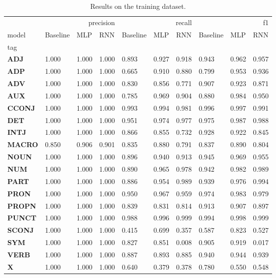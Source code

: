 \begin{table}
\caption{Results on the training dataset.}
\label{tab::ex_2_train}
\begin{tabular}{|l||l||l||l||l||l||l||l||l||l|}
\toprule
 & \multicolumn{3}{r}{precision} & \multicolumn{3}{r}{recall} & \multicolumn{3}{r}{f1} \\
model & Baseline & MLP & RNN & Baseline & MLP & RNN & Baseline & MLP & RNN \\
tag &  &  &  &  &  &  &  &  &  \\
\midrule
\textbf{ADJ} & 1.000 & 1.000 & 1.000 & 0.893 & 0.927 & 0.918 & 0.943 & 0.962 & 0.957 \\
\textbf{ADP} & 1.000 & 1.000 & 1.000 & 0.665 & 0.910 & 0.880 & 0.799 & 0.953 & 0.936 \\
\textbf{ADV} & 1.000 & 1.000 & 1.000 & 0.830 & 0.856 & 0.771 & 0.907 & 0.923 & 0.871 \\
\textbf{AUX} & 1.000 & 1.000 & 1.000 & 0.785 & 0.969 & 0.904 & 0.880 & 0.984 & 0.950 \\
\textbf{CCONJ} & 1.000 & 1.000 & 1.000 & 0.993 & 0.994 & 0.981 & 0.996 & 0.997 & 0.991 \\
\textbf{DET} & 1.000 & 1.000 & 1.000 & 0.951 & 0.974 & 0.977 & 0.975 & 0.987 & 0.988 \\
\textbf{INTJ} & 1.000 & 1.000 & 1.000 & 0.866 & 0.855 & 0.732 & 0.928 & 0.922 & 0.845 \\
\textbf{MACRO} & 0.850 & 0.906 & 0.901 & 0.835 & 0.880 & 0.791 & 0.837 & 0.890 & 0.804 \\
\textbf{NOUN} & 1.000 & 1.000 & 1.000 & 0.896 & 0.940 & 0.913 & 0.945 & 0.969 & 0.955 \\
\textbf{NUM} & 1.000 & 1.000 & 1.000 & 0.890 & 0.965 & 0.978 & 0.942 & 0.982 & 0.989 \\
\textbf{PART} & 1.000 & 1.000 & 1.000 & 0.886 & 0.954 & 0.989 & 0.939 & 0.976 & 0.994 \\
\textbf{PRON} & 1.000 & 1.000 & 1.000 & 0.950 & 0.967 & 0.959 & 0.974 & 0.983 & 0.979 \\
\textbf{PROPN} & 1.000 & 1.000 & 1.000 & 0.839 & 0.831 & 0.814 & 0.913 & 0.907 & 0.897 \\
\textbf{PUNCT} & 1.000 & 1.000 & 1.000 & 0.988 & 0.996 & 0.999 & 0.994 & 0.998 & 0.999 \\
\textbf{SCONJ} & 1.000 & 1.000 & 1.000 & 0.415 & 0.699 & 0.357 & 0.587 & 0.823 & 0.527 \\
\textbf{SYM} & 1.000 & 1.000 & 1.000 & 0.827 & 0.851 & 0.008 & 0.905 & 0.919 & 0.017 \\
\textbf{VERB} & 1.000 & 1.000 & 1.000 & 0.887 & 0.893 & 0.885 & 0.940 & 0.944 & 0.939 \\
\textbf{X} & 1.000 & 1.000 & 1.000 & 0.640 & 0.379 & 0.378 & 0.780 & 0.550 & 0.548 \\
\bottomrule
\end{tabular}
\end{table}
